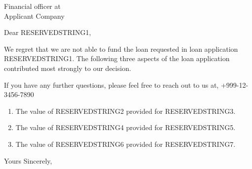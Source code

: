 \documentclass{letter}
\begin{document}
	
\address{%
	ACME Superior Lending Co. --TOTALLY FAKE\\
	12345 Common Road\\
    Somewhere on Earth 98765}
\signature{Jamie Doe\\
	Sr. Loan Officer \\
	Review Department\\
    ACME Superior Lending Co.}



\begin{letter}{Financial officer at\\
	 Applicant Company}  %

\opening{Dear RESERVEDSTRING1,}

We regret that we are not able to fund the loan requested in loan application RESERVEDSTRING1.  The following three aspects of the loan application contributed most strongly to our decision.


If you have any further questions, please feel free to reach out to us at, +999-12-3456-7890

\begin{enumerate}
	\item  The value of RESERVEDSTRING2 provided for RESERVEDSTRING3.
	\item  The value of RESERVEDSTRING4 provided for RESERVEDSTRING5.
	\item  The value of RESERVEDSTRING6 provided for RESERVEDSTRING7.
\end{enumerate}

\closing{Yours Sincerely,}

\end{letter}
\end{document}
